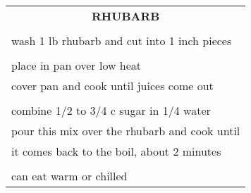 \documentclass[8pt]{report}
\begin{document}
\newpage

\centering

\begin{tabular}{|l|} \hline	%
 
\multicolumn{1}{|c|}{\textbf{RHUBARB}}
\\
\\

\index{desserts!rhubarb} \index{rhubarb}


wash 1 lb rhubarb and cut into 1 inch pieces\\
\\
place in pan over low heat\\
cover pan and cook until juices come out\\
\\
combine 1/2 to 3/4 c sugar in 1/4 water\\
pour this mix over the rhubarb and cook until\\
it comes back to the boil, about 2 minutes\\
\\
can eat warm or chilled\\





\hline

\end{tabular}

\newpage
\centering
\end{document}
